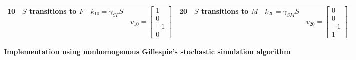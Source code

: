 \documentclass[11pt]{article}
\begin{document}
\begin{table}[h!]
{\begin{tabular}{|c|c|c|c||c|c|c|c|}
\hline
10 & $S$ transitions to $F$ & $k_{10}=\gamma_{SF}S$ & $v_{10}=\begin{bmatrix}1\\0\\-1\\0\end{bmatrix}$ & 20 & $S$ transitions to $M$ & $k_{20}=\gamma_{SM}S$ & $v_20=\begin{bmatrix}0\\0\\-1\\1\end{bmatrix}$\\
\hline
\end{tabular}}
\end{table}

\vspace{10pt}
\noindent \textbf{Implementation using nonhomogenous Gillespie's stochastic simulation algorithm}
\end{document}
